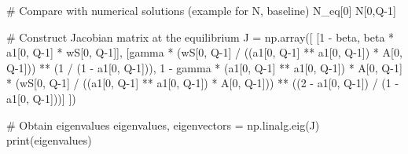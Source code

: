 \documentclass[
  letterpaper,
  DIV=11,
  numbers=noendperiod]{scrreprt}
\newenvironment{Shaded}{\begin{snugshade}}{\end{snugshade}}
\newcommand{\BuiltInTok}[1]{\textcolor[rgb]{0.00,0.23,0.31}{#1}}
\newcommand{\CommentTok}[1]{\textcolor[rgb]{0.37,0.37,0.37}{#1}}
\newcommand{\DecValTok}[1]{\textcolor[rgb]{0.68,0.00,0.00}{#1}}
\newcommand{\NormalTok}[1]{\textcolor[rgb]{0.00,0.23,0.31}{#1}}
\newcommand{\OperatorTok}[1]{\textcolor[rgb]{0.37,0.37,0.37}{#1}}
\begin{document}
\begin{tcolorbox}
\begin{Shaded}
\begin{Highlighting}[]
\CommentTok{\# Compare with numerical solutions (example for N, baseline)}
\NormalTok{N\_eq[}\DecValTok{0}\NormalTok{]}
\NormalTok{N[}\DecValTok{0}\NormalTok{,Q}\OperatorTok{{-}}\DecValTok{1}\NormalTok{]}

\CommentTok{\# Construct Jacobian matrix at the equilibrium }
\NormalTok{J }\OperatorTok{=}\NormalTok{ np.array([}
\NormalTok{    [}\DecValTok{1} \OperatorTok{{-}}\NormalTok{ beta, beta }\OperatorTok{*}\NormalTok{ a1[}\DecValTok{0}\NormalTok{, Q}\OperatorTok{{-}}\DecValTok{1}\NormalTok{] }\OperatorTok{*}\NormalTok{ wS[}\DecValTok{0}\NormalTok{, Q}\OperatorTok{{-}}\DecValTok{1}\NormalTok{]],}
\NormalTok{    [gamma }\OperatorTok{*}\NormalTok{ (wS[}\DecValTok{0}\NormalTok{, Q}\OperatorTok{{-}}\DecValTok{1}\NormalTok{] }\OperatorTok{/}\NormalTok{ ((a1[}\DecValTok{0}\NormalTok{, Q}\OperatorTok{{-}}\DecValTok{1}\NormalTok{] }\OperatorTok{**}\NormalTok{ a1[}\DecValTok{0}\NormalTok{, Q}\OperatorTok{{-}}\DecValTok{1}\NormalTok{]) }\OperatorTok{*}\NormalTok{ A[}\DecValTok{0}\NormalTok{, Q}\OperatorTok{{-}}\DecValTok{1}\NormalTok{])) }\OperatorTok{**}\NormalTok{ (}\DecValTok{1} \OperatorTok{/}\NormalTok{ (}\DecValTok{1} \OperatorTok{{-}}\NormalTok{ a1[}\DecValTok{0}\NormalTok{, Q}\OperatorTok{{-}}\DecValTok{1}\NormalTok{])),}
     \DecValTok{1} \OperatorTok{{-}}\NormalTok{ gamma }\OperatorTok{*}\NormalTok{ (a1[}\DecValTok{0}\NormalTok{, Q}\OperatorTok{{-}}\DecValTok{1}\NormalTok{] }\OperatorTok{**}\NormalTok{ a1[}\DecValTok{0}\NormalTok{, Q}\OperatorTok{{-}}\DecValTok{1}\NormalTok{]) }\OperatorTok{*}\NormalTok{ A[}\DecValTok{0}\NormalTok{, Q}\OperatorTok{{-}}\DecValTok{1}\NormalTok{] }\OperatorTok{*}\NormalTok{ (wS[}\DecValTok{0}\NormalTok{, Q}\OperatorTok{{-}}\DecValTok{1}\NormalTok{] }\OperatorTok{/}\NormalTok{ ((a1[}\DecValTok{0}\NormalTok{, Q}\OperatorTok{{-}}\DecValTok{1}\NormalTok{] }\OperatorTok{**}\NormalTok{ a1[}\DecValTok{0}\NormalTok{, Q}\OperatorTok{{-}}\DecValTok{1}\NormalTok{]) }\OperatorTok{*}\NormalTok{ A[}\DecValTok{0}\NormalTok{, Q}\OperatorTok{{-}}\DecValTok{1}\NormalTok{])) }\OperatorTok{**}\NormalTok{ ((}\DecValTok{2} \OperatorTok{{-}}\NormalTok{ a1[}\DecValTok{0}\NormalTok{, Q}\OperatorTok{{-}}\DecValTok{1}\NormalTok{]) }\OperatorTok{/}\NormalTok{ (}\DecValTok{1} \OperatorTok{{-}}\NormalTok{ a1[}\DecValTok{0}\NormalTok{, Q}\OperatorTok{{-}}\DecValTok{1}\NormalTok{]))]}
\NormalTok{])}

\CommentTok{\# Obtain eigenvalues}
\NormalTok{eigenvalues, eigenvectors }\OperatorTok{=}\NormalTok{ np.linalg.eig(J)}
\BuiltInTok{print}\NormalTok{(eigenvalues)}


\end{Highlighting}
\end{Shaded}
\end{tcolorbox}
\end{document}

